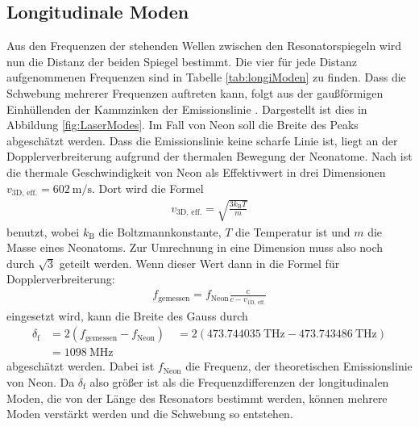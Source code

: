 \subsection{Longitudinale Moden}

Aus den Frequenzen der stehenden Wellen zwischen den Resonatorspiegeln wird nun die Distanz der beiden Spiegel bestimmt. Die vier für jede Distanz aufgenommenen Frequenzen sind in Tabelle \ref{tab:longiModen} zu finden. Dass die Schwebung mehrerer Frequenzen auftreten kann, folgt aus der gaußförmigen Einhüllenden der Kammzinken der Emissionslinie \cite{longimodenText}.
Dargestellt ist dies in Abbildung \ref{fig:LaserModes}. Im Fall von Neon soll die Breite des Peaks abgeschätzt werden. Dass die Emissionslinie keine scharfe Linie ist, liegt an der Dopplerverbreiterung aufgrund der thermalen Bewegung der Neonatome. Nach \cite{thermal} ist die thermale Geschwindigkeit von Neon als Effektivwert in drei Dimensionen $v_\text{3D, eff.} = \SI{602}{\meter\per\second}$. Dort wird die Formel
\begin{align}
  v_\text{3D, eff.} = \sqrt{\frac{3 k_\text{B} T}{m}}
\end{align}
benutzt, wobei $k_\text{B}$ die Boltzmannkonstante, $T$ die Temperatur ist und $m$ die Masse eines Neonatoms. Zur Umrechnung in eine Dimension muss also noch durch $\sqrt{3}$ geteilt werden. Wenn dieser Wert dann in die Formel für Dopplerverbreiterung:
\begin{align}
  f_\text{gemessen} = f_\text{Neon} \frac{c}{c - v_\text{1D, eff.}}
\end{align}
eingesetzt wird, kann die Breite des Gauss durch
\begin{align*}
  \delta_\text{f} &= 2 (f_\text{gemessen} - f_\text{Neon})
                  \quad = 2 (\SI{473.744035}{\tera\hertz} - \SI{473.743486}{\tera\hertz})\\
                  &= \SI{1098}{\mega\hertz}
\end{align*}
abgeschätzt werden. Dabei ist $f_\text{Neon}$ die Frequenz, der theoretischen Emissionslinie von Neon. Da $\delta_\text{f}$ also größer ist als die Frequenzdifferenzen der longitudinalen Moden, die von der Länge des Resonators bestimmt werden, können mehrere Moden verstärkt werden und die Schwebung so entstehen.
